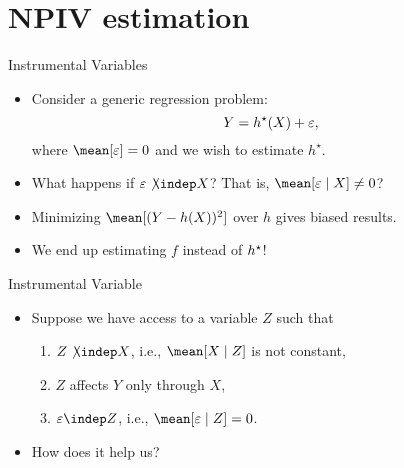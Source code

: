 \documentclass[aspectratio=169]{beamer}
\begin{document}
    \frame{\titlepage}

    \section{NPIV estimation}

    \begin{frame}{Instrumental Variables}
        \begin{itemize}
            \item<1-> Consider a generic regression problem:
                \begin{equation*}
                    Y = h^{ \star } ( X ) + \varepsilon
                ,\end{equation*}
                where $ \mean [ \varepsilon ] = 0 $ and we wish to estimate $ h^{ \star } $.

                \item<2-> What happens if $ \varepsilon \not\kern-1pt\indep X $? That is, $ \mean [ \varepsilon \mid X ] \neq 0 $?
                \item<3-> Minimizing $ \mean [ ( Y - h ( X ) )^2 ] $ over $ h $ gives biased results.
                \item<5-> We end up estimating $ f $ instead of $ h^{ \star } $!
        \end{itemize}
    \end{frame}

    \begin{frame}{Instrumental Variable}
        \begin{itemize}
            \item<1-> Suppose we have access to a variable $ Z $ such that
                \begin{enumerate}
                    \item<2-> $ Z \not\kern-1pt\indep X $, i.e., $ \mean [ X \mid Z ] $ is not constant,
                    \item<3-> $ Z $ affects $ Y $ only through $ X $,
                    \item<4-> $ \varepsilon \indep Z $, i.e., $ \mean [ \varepsilon \mid Z ] = 0 $.
                \end{enumerate}
                \item<6-> How does it help us?
        \end{itemize}
    \end{frame}
\end{document}
